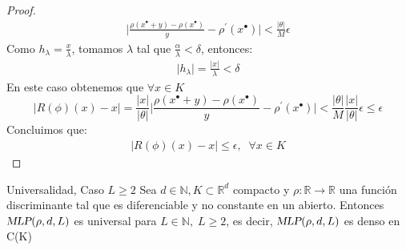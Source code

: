 \documentclass[12pt,a4paper]{book}
\providecommand{\der}[1]{#1^{\prime}}
\providecommand{\abs}[1]{\lvert#1\rvert}
\providecommand{\mlp}[1]{\textsl{MLP}(\rho,d,#1)}
\begin{document}
\begin{proof}
\begin{equation*}
\begin{split}
\abs{\frac{\rho(x^{\bullet}+y)-\rho(x^{\bullet})}{y}-\der{\rho}(x^{\bullet})}<\frac{\abs{\theta}}{M}\epsilon
\end{split}
\end{equation*}
Como $h_{\lambda}=\frac{x}{\lambda}$, tomamos $\lambda$ tal que $\frac{\alpha}{\lambda}<\delta$, entonces:
\begin{equation*}
\begin{split}
\abs{h_{\lambda}}=\frac{\abs{x}}{\lambda}<\delta
\end{split}
\end{equation*}
En este caso obtenemos que $\forall x\in K$
\begin{equation*}
\abs{R(\phi)(x)-x}=\frac{\abs{x}}{\abs{\theta}}\abs{\frac{\rho(x^{\bullet}+y)-\rho(x^{\bullet})}{y}-\der{\rho}(x^{\bullet})}<\frac{\abs{\theta}}{M}\frac{\abs{x}}{\abs{\theta}}\epsilon\leq\epsilon
\end{equation*}
Concluimos que:
\begin{equation*}
\begin{split}
\abs{R(\phi)(x)-x}\leq\epsilon ,\;\;\forall x\in K
\end{split}
\end{equation*}
\end{proof}
\begin{teorema}{Universalidad, Caso $L\geq 2$}{}
Sea $d\in\mathbb{N},K\subset\mathbb{R}^{d}$ compacto y $\rho :\mathbb{R}\rightarrow\mathbb{R}$ una función discriminante tal que es diferenciable y no constante en un abierto. Entonces $\mlp{L}$ es universal para $L\in\mathbb{N},\;L\geq 2$, es decir, $\mlp{L}$ es denso en C(K)
\end{teorema}
\end{document}
